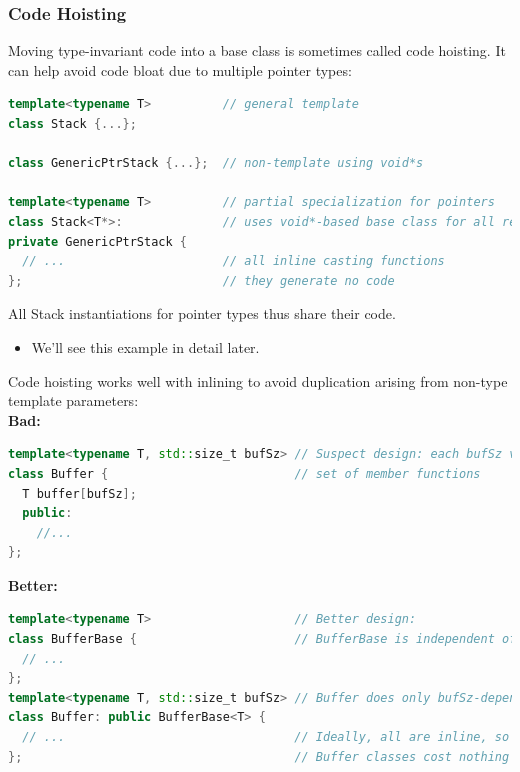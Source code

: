 \subsubsection{Code Hoisting}
Moving type-invariant code into a base class is sometimes called code hoisting. It can help avoid code bloat due to multiple pointer types:
\begin{lstlisting}[language=C++]
template<typename T>          // general template
class Stack {...};

class GenericPtrStack {...};  // non-template using void*s

template<typename T>          // partial specialization for pointers
class Stack<T*>:              // uses void*-based base class for all real work
private GenericPtrStack {
  // ...                      // all inline casting functions
};                            // they generate no code
\end{lstlisting}
All Stack instantiations for pointer types thus share their code.
\begin{itemize}
  \item We'll see this example in detail later.
\end{itemize}

Code hoisting works well with inlining to avoid duplication arising from non-type template parameters:\\
\textbf{Bad:}
\begin{lstlisting}[language=C++]
template<typename T, std::size_t bufSz> // Suspect design: each bufSz value will yield a new
class Buffer {                          // set of member functions
  T buffer[bufSz];
  public:
    //...
};
\end{lstlisting}
\textbf{Better:}
\begin{lstlisting}[language=C++]
template<typename T>                    // Better design:
class BufferBase {                      // BufferBase is independent of bufSz
  // ...
};
template<typename T, std::size_t bufSz> // Buffer does only bufSz-dependent operations.
class Buffer: public BufferBase<T> {
  // ...                                // Ideally, all are inline, so
};                                      // Buffer classes cost nothing
\end{lstlisting}

